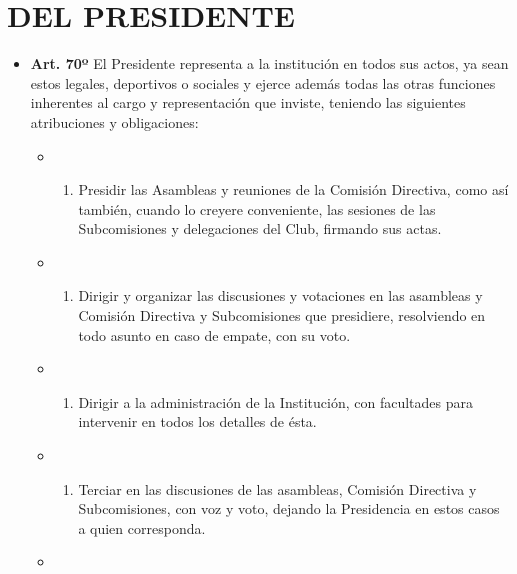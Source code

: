 \documentclass[]{book}
\providecommand{\tightlist}{%
  \setlength{\itemsep}{0pt}\setlength{\parskip}{0pt}}
\begin{document}
\chapter{DEL PRESIDENTE}\label{cap8}

\begin{itemize}
\tightlist
\item
  \textbf{Art. 70º} El Presidente representa a la institución en todos
  sus actos, ya sean estos legales, deportivos o sociales y ejerce
  además todas las otras funciones inherentes al cargo y representación
  que inviste, teniendo las siguientes atribuciones y obligaciones:

  \begin{itemize}
  \item
    \begin{enumerate}
    \def\labelenumi{\alph{enumi})}
    \tightlist
    \item
      Presidir las Asambleas y reuniones de la Comisión Directiva, como
      así también, cuando lo creyere conveniente, las sesiones de las
      Subcomisiones y delegaciones del Club, firmando sus actas.
    \end{enumerate}
  \item
    \begin{enumerate}
    \def\labelenumi{\alph{enumi})}
    \setcounter{enumi}{1}
    \tightlist
    \item
      Dirigir y organizar las discusiones y votaciones en las asambleas
      y Comisión Directiva y Subcomisiones que presidiere, resolviendo
      en todo asunto en caso de empate, con su voto.
    \end{enumerate}
  \item
    \begin{enumerate}
    \def\labelenumi{\alph{enumi})}
    \setcounter{enumi}{2}
    \tightlist
    \item
      Dirigir a la administración de la Institución, con facultades para
      intervenir en todos los detalles de ésta.
    \end{enumerate}
  \item
    \begin{enumerate}
    \def\labelenumi{\alph{enumi})}
    \setcounter{enumi}{3}
    \tightlist
    \item
      Terciar en las discusiones de las asambleas, Comisión Directiva y
      Subcomisiones, con voz y voto, dejando la Presidencia en estos
      casos a quien corresponda.
    \end{enumerate}
  \item

\end{itemize}
\end{itemize}
\end{document}
